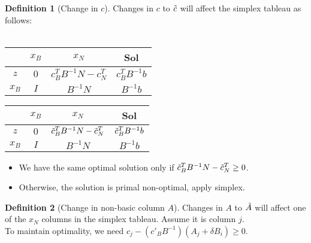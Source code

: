 \documentclass{article}
\theoremstyle{definition}
\newtheorem{definition}{Definition}[section]
\begin{document}
	\begin{definition} [Change in $c$] \hfill \break
	    Changes in $c$ to $\Tilde{c}$ will affect the simplex tableau as follows:\\\\
    	\begin{minipage}{.5\linewidth}
          \centering
    		\begin{tabular}{ | c | c | c | c | } 
    			\hline
    			& $x_B$ & $x_N$ & Sol \\
    			\hline
    			$z$ & $0$ & $c_B^TB^{-1}N-c_N^T$ & $c_B^TB^{-1}b$ \\
    			\hline
    			$x_B$ & $I$ & $B^{-1}N$ & $B^{-1}b$ \\
    			\hline
    		\end{tabular}
        \end{minipage}
        \begin{minipage}{.5\linewidth}
          \centering
    		\begin{tabular}{ | c | c | c | c | } 
    		    \hline
    			& $x_B$ & $x_N$ & Sol \\
    			\hline
    			$z$ & $0$ & $\Tilde{c}_B^TB^{-1}N-\Tilde{c}_N^T$ & $\Tilde{c}_B^TB^{-1}b$ \\
    			\hline
    			$x_B$ & $I$ & $B^{-1}N$ & $B^{-1}b$ \\
    			\hline
    		\end{tabular}
        \end{minipage}
        \hfill
        
        \begin{itemize}
            \item We have the same optimal solution only if $\Tilde{c}_B^TB^{-1}N-\Tilde{c}_N^T \geq 0$.
            \item Otherwise, the solution is primal non-optimal, apply simplex.
        \end{itemize}
	\end{definition}
	
	\begin{definition} [Change in non-basic column $A$] \hfill \break
	    Changes in $A$ to $\Tilde{A}$ will affect one of the $x_N$ columns in the simplex tableau. Assume it is column $j$.\\
	    To maintain optimality, we need $c_j-(c'_BB^{-1})(A_j + \delta B_i) \geq 0$.
	\end{definition}
	
\end{document}
